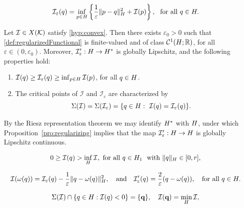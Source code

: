 \documentclass[10pt,a4paper]{amsart}
\newcommand{\Hilb}{{\textnormal H}}
\newcommand{\R}{\mathbb{R}}
\newcommand{\X}{{\textnormal X}}
\newcommand{\boC}{\mathcal{C}}
\newcommand{\boI}{\mathcal{I}}
\newcommand{\boK}{\mathcal{K}}
\newcommand{\minq}{{\bf q}}
\begin{document}
\begin{equation}\label{def:regularizedFunctional}
	\boI_\varepsilon(q)=\inf_{p\in\Hilb}\left\{\frac1\varepsilon\|p-q\|^2_{\Hilb} + \boI(p)\right\},\ \hbox{ for all }q\in\Hilb.
\end{equation}

\begin{proposition}\label{pro:regularizing} Let $\boI\in\X(\boK)$ satisfy \eqref{hyp:convex}. Then there exists $\varepsilon_0>0$ such that \eqref{def:regularizedFunctional} is finite-valued and of class $\boC^1(\Hilb;\R)$,  for all $\varepsilon\in(0,\varepsilon_0)$. Moreover, $\boI'_\varepsilon:\Hilb\to\Hilb^*$ is globally Lipschitz, and the following properties hold:
	\begin{enumerate}
		\item[(i)]$ \boI(q)\geq \boI_\varepsilon(q) \geq \inf_{p\in\Hilb} \boI(p)$, for all $q\in\Hilb$. 
		\item[(ii)] The critical points of $\boI$ and $\boI_\varepsilon$ are characterized by
		\begin{equation}\label{def:CriticalPoint-Iepsilon}
			\Sigma(\boI)=\Sigma(\boI_\varepsilon)=\{q\in\Hilb:\ \boI(q)=\boI_\varepsilon(q)\}.
		\end{equation}
	\end{enumerate}
\end{proposition}

\begin{remark}\label{remark:Lipschitz}
By the Riesz representation theorem we may identify $\Hilb^*$ with $\Hilb$, under which Proposition~\ref{pro:regularizing} implies that the map $\boI'_\varepsilon:\Hilb\to\Hilb$ is globally Lipschitz continuous.
\end{remark}

\begin{equation}\label{H:negative_levels}
0\geq\boI(q)>\inf_\Hilb\boI,\ \hbox{for all }q\in\Hilb_1\ \hbox{ with }\|q\|_\Hilb\in[0,r],
\end{equation}

\begin{equation}\label{def:omega}
	\boI(\omega(q))=\boI_\varepsilon(q)-\dfrac{1}{\varepsilon}\|q-\omega(q)\|_\Hilb^2,\quad\hbox{and}\quad   \boI_\varepsilon'(q)=\frac{2}{\varepsilon}(q-\omega(q)),\quad \hbox{for all }q\in\Hilb.
\end{equation}

\begin{equation}\label{H:existence_unique_minimizer}
    \Sigma(\boI)\cap \{q\in\Hilb: \boI(q)<0\}=\{\minq\},\quad\boI(\minq)=\min_\Hilb\boI,
\end{equation}
\end{document}
